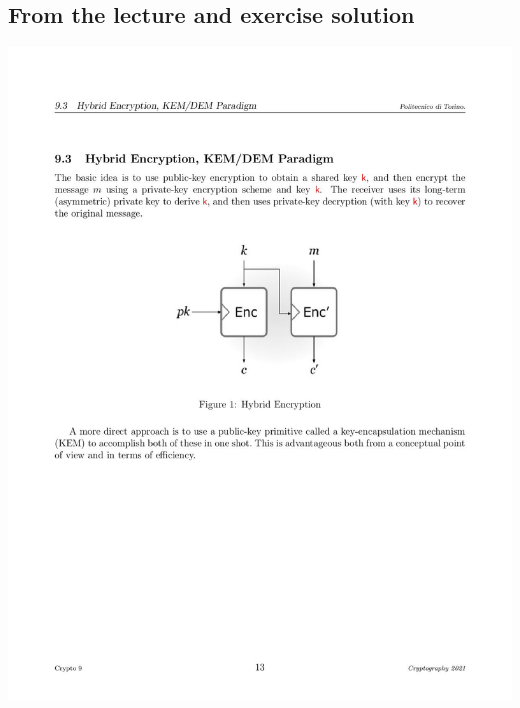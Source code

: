 \documentclass{article}
\begin{document}
\subsection{From the lecture and exercise solution}


\includegraphics[scale=.7]{Crypto9-13-page-001.jpg}
\end{document}
